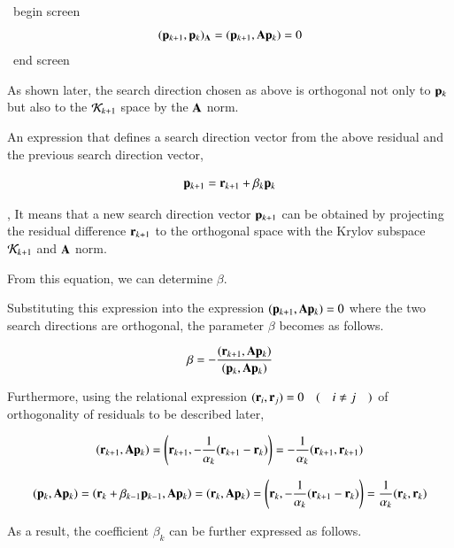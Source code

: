 \ begin {screen}
\begin{equation}
(\mathbf{p}_{k+1},\mathbf{p}_k)_{\mathbf{A}}=(\mathbf{p}_{k+1},\mathbf{A}\mathbf{p}_k)=0
\end{equation}
\ end {screen}

As shown later, the search direction chosen as above is orthogonal not only to $\mathbf{p}_{k}$ but also to the ${\cal K}_{k+1}$ space by the $\mathbf{A}$ norm.

An expression that defines a search direction vector from the above residual and the previous search direction vector,


\begin{equation}
\mathbf{p}_{k+1}=\mathbf{r}_{k+1}+\beta_k\mathbf{p}_k
\end{equation}


, It means that a new search direction vector $\mathbf{p}_{k+1}$ can be obtained by projecting the residual difference $\mathbf{r}_{k+1}$ to the orthogonal space with the Krylov subspace ${\cal K}_{k+1}$ and $\mathbf{A}$ norm.

From this equation, we can determine $\beta$.

Substituting this expression into the expression $(\mathbf{p}_{k+1},\mathbf{A}\mathbf{p}_k)=0$ where the two search directions are orthogonal, the parameter $\beta$ becomes as follows. ~

\begin{equation}
\beta=-\frac{(\mathbf{r}_{k+1},\mathbf{A}\mathbf{p}_k)}{(\mathbf{p}_k,\mathbf{A}\mathbf{p}_k)}
\end{equation}



Furthermore, using the relational expression $(\mathbf{r}_i,\mathbf{r}_j)=0 \quad (\quad i\ne j\quad)$ of orthogonality of residuals to be described later,

\begin{equation}
(\mathbf{r}_{k+1},\mathbf{A}\mathbf{p}_k)=\left(\mathbf{r}_{k+1},-\frac{1}{\alpha_k}(\mathbf{r}_{k+1}-\mathbf{r}_k)\right)=-\frac{1}{\alpha_k}(\mathbf{r}_{k+1},\mathbf{r}_{k+1})
\end{equation}

\begin{equation}
(\mathbf{p}_k,\mathbf{A}\mathbf{p}_k)=\left(\mathbf{r}_k+\beta_{k-1}\mathbf{p}_{k-1},\mathbf{A}\mathbf{p}_k\right)=\left(\mathbf{r}_k,\mathbf{A}\mathbf{p}_k\right)=\left(\mathbf{r}_k,-\frac{1}{\alpha_k}(\mathbf{r}_{k+1}-\mathbf{r}_k)\right)=\frac{1}{\alpha_k}(\mathbf{r}_k,\mathbf{r}_k)
\end{equation}

As a result, the coefficient $\beta_k$ can be further expressed as follows.


